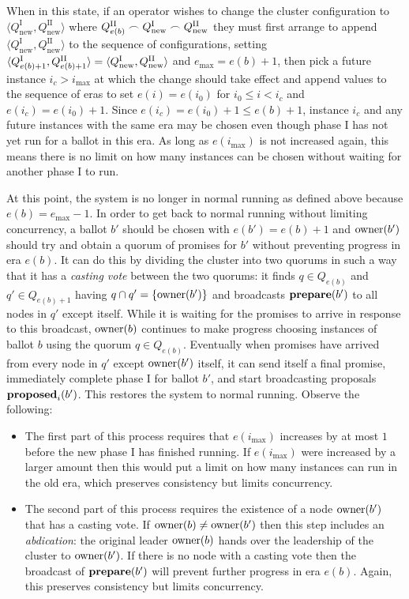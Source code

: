 \documentclass[journal]{IEEEtran}
\begin{document}
\def\Qnew#1{Q^\textrm{#1}_\textrm{new}}

When in this state, if an operator wishes to change the cluster configuration
to $\langle \Qnew{I}, \Qnew{II} \rangle$ where $\QII{e(b)} \frown \Qnew{I}
\frown \Qnew{II}$ they must first arrange to append $\langle \Qnew{I},
\Qnew{II} \rangle$ to the sequence of configurations, setting $\langle
\QI{e(b)+1}, \QII{e(b)+1} \rangle = \langle \Qnew{I}, \Qnew{II} \rangle$ and
$e_\mathrm{max} = e(b) + 1$, then pick a future instance $i_c > i_\mathrm{max}$
at which the change should take effect and append values to the sequence of
eras to set $e(i) = e(i_0)$ for $i_0 \le i < i_c$ and $e(i_c) = e(i_0) + 1$.
Since $e(i_c) = e(i_0) + 1 \le e(b) + 1$, instance $i_c$ and any future
instances with the same era may be chosen even though phase I has not yet run
for a ballot in this era.  As long as $e(i_\mathrm{max})$ is not increased
again, this means there is no limit on how many instances can be chosen without
waiting for another phase I to run.

At this point, the system is no longer in normal running as defined above
because $e(b) = e_\mathrm{max} - 1$. In order to get back to normal running
without limiting concurrency, a ballot $b'$ should be chosen with $e(b') = e(b)
+ 1$ and $\mathrm{owner}(b')$ should try and obtain a quorum of promises for $b'$
without preventing progress in era $e(b)$. It can do this by dividing the
cluster into two quorums in such a way that it has a \textit{casting vote}
between the two quorums: it finds $q \in Q_{e(b)}$ and $q' \in Q_{e(b)+1}$
having $q \cap q' = \{\mathrm{owner}(b')\}$ and broadcasts $\mathbf{prepare}(b')$ to all nodes in
$q'$ except itself. While it is waiting for the promises to arrive in response
to this broadcast, $\mathrm{owner}(b)$ continues to make progress choosing instances of
ballot $b$ using the quorum $q \in Q_{e(b)}$.  Eventually when promises have
arrived from every node in $q'$ except $\mathrm{owner}(b')$ itself, it can send itself
a final promise, immediately complete phase I for ballot $b'$, and start
broadcasting proposals $\mathbf{proposed}_{i}(b')$.  This restores the system to normal
running. Observe the following:
%
\begin{itemize}
%
\item The first part of this process requires that $e(i_\mathrm{max})$
increases by at most $1$ before the new phase I has finished running. If
$e(i_\mathrm{max})$ were increased by a larger amount then this would put a
limit on how many instances can run in the old era, which preserves consistency
but limits concurrency.
%
\item The second part of this process requires the existence of a node
$\mathrm{owner}(b')$ that has a casting vote. If $\mathrm{owner}(b) \ne \mathrm{owner}(b')$ then this
step includes an \textit{abdication}: the original leader $\mathrm{owner}(b)$ hands
over the leadership of the cluster to $\mathrm{owner}(b')$. If there is no node with a
casting vote then the broadcast of $\mathbf{prepare}(b')$ will prevent further progress in
era $e(b)$. Again, this preserves consistency but limits concurrency.
%
\end{itemize}
\end{document}

